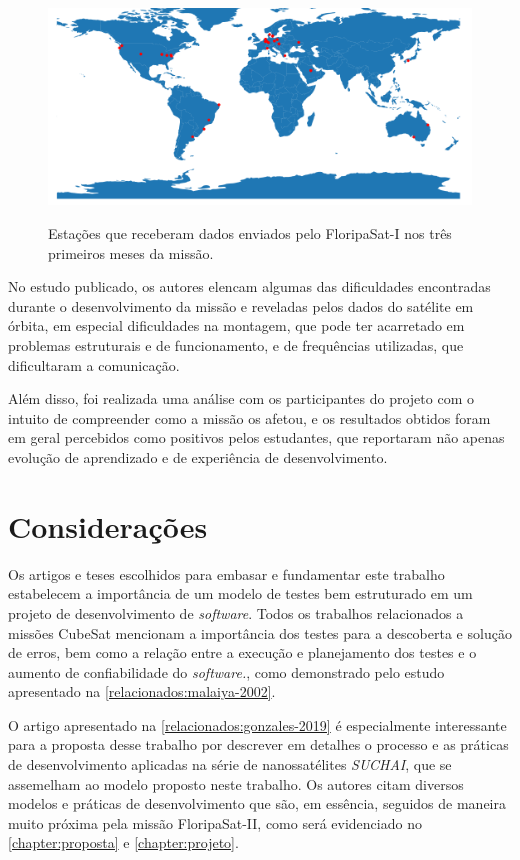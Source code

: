 \begin{figure}[h!]
    \centering
    \caption{Estações que receberam dados enviados pelo FloripaSat-I nos três primeiros meses da missão.}
    \includegraphics[width=\textwidth]{images/floripasat_stations.png}
    \label{fig:floripasat-stations}
\end{figure}

No estudo publicado, os autores elencam algumas das dificuldades encontradas durante o desenvolvimento da missão e reveladas pelos dados do satélite em órbita, em especial dificuldades na montagem, que pode ter acarretado em problemas estruturais e de funcionamento, e de frequências utilizadas, que dificultaram a comunicação.

Além disso, foi realizada uma análise com os participantes do projeto com o intuito de compreender como a missão os afetou, e os resultados obtidos foram em geral percebidos como positivos pelos estudantes, que reportaram não apenas evolução de aprendizado e de experiência de desenvolvimento.

%

\section{Considerações}

Os artigos e teses escolhidos para embasar e fundamentar este trabalho estabelecem a importância de um modelo de testes bem estruturado em um projeto de desenvolvimento de \textit{software}. Todos os trabalhos relacionados a missões CubeSat mencionam a importância dos testes para a descoberta e solução de erros, bem como a relação entre a execução e planejamento dos testes e o aumento de confiabilidade do \textit{software.}, como demonstrado pelo estudo apresentado na \autoref{relacionados:malaiya-2002}.

O artigo apresentado na \autoref{relacionados:gonzales-2019} é especialmente interessante para a proposta desse trabalho por descrever em detalhes o processo e as práticas de desenvolvimento aplicadas na série de nanossatélites \textit{SUCHAI}, que se assemelham ao modelo proposto neste trabalho. Os autores citam diversos modelos e práticas de desenvolvimento que são, em essência, seguidos de maneira muito próxima pela missão FloripaSat-II, como será evidenciado no \autoref{chapter:proposta} e \autoref{chapter:projeto}.

